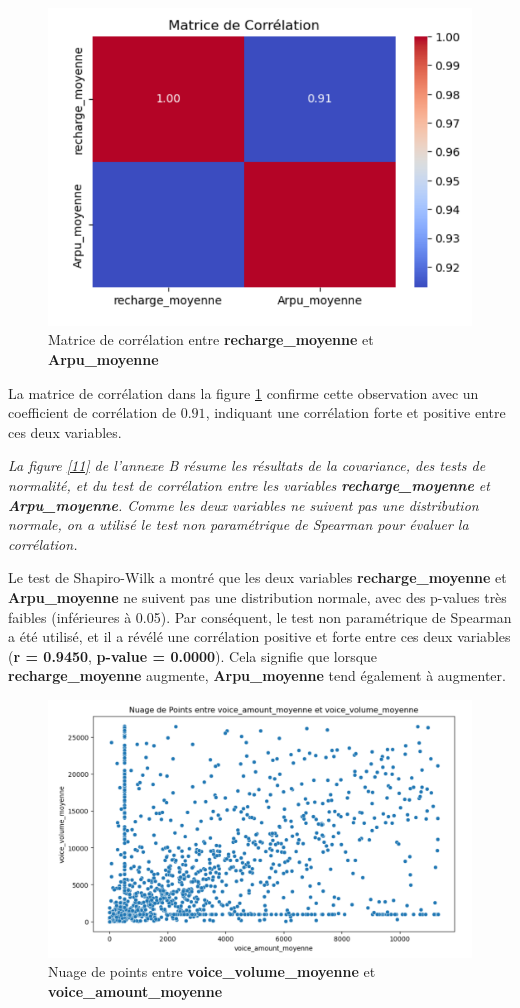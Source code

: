 \begin{figure}[H]
    \centering
    \includegraphics[width=0.5\linewidth]{capture_sas_48.png}
    \caption{Matrice de corrélation entre \textbf{recharge\_moyenne} et \textbf{Arpu\_moyenne}}
    \label{matrice1}
\end{figure}

\noindent
La matrice de corrélation dans la figure \ref{matrice1} confirme cette observation avec un coefficient de corrélation de \(0.91\), indiquant une corrélation forte et positive entre ces deux variables.\par

\textit{La figure \ref{11} de l'annexe B résume les résultats de la covariance, des tests de normalité, et du test de corrélation entre les variables \textbf{recharge\_moyenne} et \textbf{Arpu\_moyenne}. Comme les deux variables ne suivent pas une distribution normale, on a utilisé le test non paramétrique de Spearman pour évaluer la corrélation.}



\noindent
Le test de Shapiro-Wilk a montré que les deux variables \textbf{recharge\_moyenne} et \textbf{Arpu\_moyenne} ne suivent pas une distribution normale, avec des p-values très faibles (inférieures à 0.05). Par conséquent, le test non paramétrique de Spearman a été utilisé, et il a révélé une corrélation positive et forte entre ces deux variables (\textbf{r = 0.9450}, \textbf{p-value = 0.0000}). Cela signifie que lorsque \textbf{recharge\_moyenne} augmente, \textbf{Arpu\_moyenne} tend également à augmenter.

\begin{figure}[H]
    \centering
    \includegraphics[width=0.6\linewidth]{capture_sas_50.png}
    \caption{Nuage de points entre \textbf{voice\_volume\_moyenne} et \textbf{voice\_amount\_moyenne}}
    \label{nuage4}
\end{figure}

